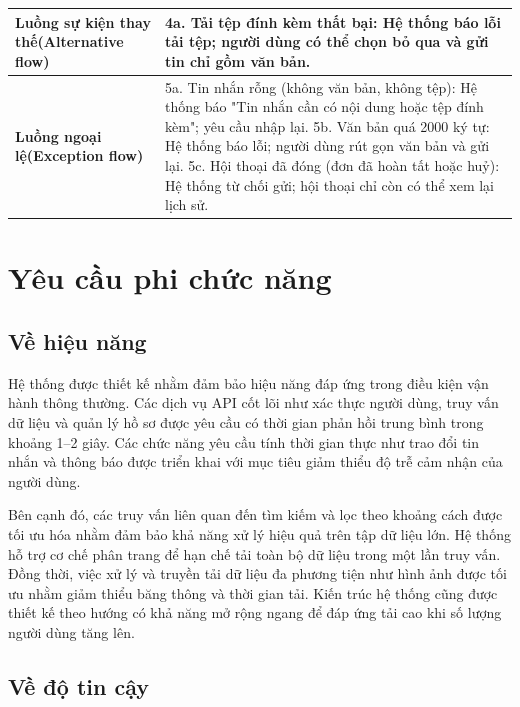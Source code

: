 \documentclass[../main.tex]{subfiles}%
\begin{document}
\begin{longtable}{|p{3.5cm}|p{11.5cm}|}
\textbf{Luồng sự kiện thay thế\newline(Alternative flow)} &
4a. Tải tệp đính kèm thất bại: Hệ thống báo lỗi tải tệp; người dùng có thể chọn bỏ qua và gửi tin chỉ gồm văn bản. \\ \hline
\textbf{Luồng ngoại lệ\newline(Exception flow)} &
5a. Tin nhắn rỗng (không văn bản, không tệp): Hệ thống báo "Tin nhắn cần có nội dung hoặc tệp đính kèm"; yêu cầu nhập lại. \newline
5b. Văn bản quá 2000 ký tự: Hệ thống báo lỗi; người dùng rút gọn văn bản và gửi lại. \newline
5c. Hội thoại đã đóng (đơn đã hoàn tất hoặc huỷ): Hệ thống từ chối gửi; hội thoại chỉ còn có thể xem lại lịch sử. \\ \hline
\end{longtable}
\endgroup

\section{Yêu cầu phi chức năng}
\label{section:2.5}

\subsection{Về hiệu năng}
\label{section:2.5.1}

Hệ thống được thiết kế nhằm đảm bảo hiệu năng đáp ứng trong điều kiện vận hành thông thường. Các dịch vụ API cốt lõi như xác thực người dùng, truy vấn dữ liệu và quản lý hồ sơ được yêu cầu có thời gian phản hồi trung bình trong khoảng 1–2 giây. Các chức năng yêu cầu tính thời gian thực như trao đổi tin nhắn và thông báo được triển khai với mục tiêu giảm thiểu độ trễ cảm nhận của người dùng.

Bên cạnh đó, các truy vấn liên quan đến tìm kiếm và lọc theo khoảng cách được tối ưu hóa nhằm đảm bảo khả năng xử lý hiệu quả trên tập dữ liệu lớn. Hệ thống hỗ trợ cơ chế phân trang để hạn chế tải toàn bộ dữ liệu trong một lần truy vấn. Đồng thời, việc xử lý và truyền tải dữ liệu đa phương tiện như hình ảnh được tối ưu nhằm giảm thiểu băng thông và thời gian tải. Kiến trúc hệ thống cũng được thiết kế theo hướng có khả năng mở rộng ngang để đáp ứng tải cao khi số lượng người dùng tăng lên.

\subsection{Về độ tin cậy}
\label{section:2.5.2}
\end{document}
